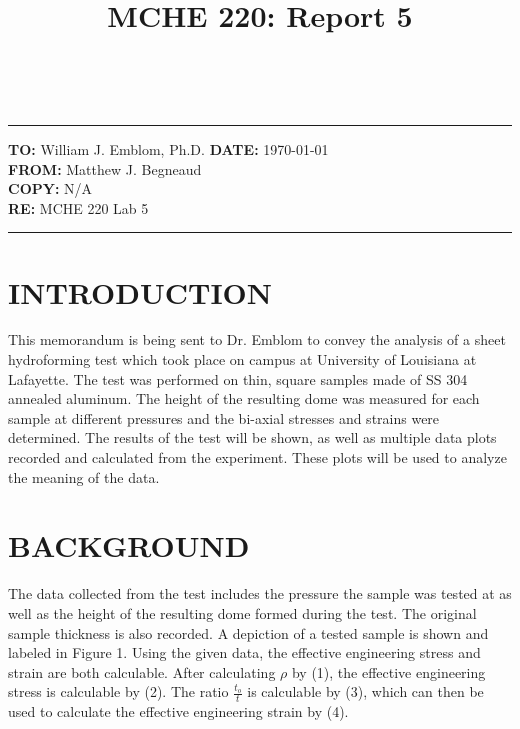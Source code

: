 \documentclass[12pt]{article}
\title{MCHE 220: Report 5}
\begin{document}
\fancyhf{}  
  \renewcommand{\headrulewidth}{0pt}
    \pagestyle{plain}
    
\captionsetup[table]{labelsep=space}

\begin{flushleft}
\hrulefill\\\hrule height 1pt
\vspace{5pt}
\textbf{TO: }William J. Emblom, Ph.D.  \hfill   \textbf{DATE: }\today                
\bigskip\\
\textbf{FROM: }Matthew J. Begneaud
\bigskip\\
\textbf{COPY: }N/A
\bigskip\\
\textbf{RE: }MCHE 220 Lab 5
\vspace{-10pt}
\end{flushleft}
\hrulefill \hrule height 1pt


\section*{\fontsize{12}{12}\selectfont INTRODUCTION}
This memorandum is being sent to Dr. Emblom to convey the analysis of a sheet hydroforming test which took place on campus at University of Louisiana at Lafayette. The test was performed on thin, square samples made of SS 304 annealed aluminum. The height of the resulting dome was measured for each sample at different pressures and the bi-axial stresses and strains were determined. The results of the test will be shown, as well as multiple data plots recorded and calculated from the experiment. These plots will be used to analyze the meaning of the data.
\bigskip



\section*{\fontsize{12}{12}\selectfont BACKGROUND}
The data collected from the test includes the pressure the sample was tested at as well as the height of the resulting dome formed during the test. The original sample thickness is also recorded. A depiction of a tested sample is shown and labeled in Figure 1. Using the given data, the effective engineering stress and strain are both calculable. After calculating $\rho$ by (1), the effective engineering stress is calculable by (2). The ratio $\frac{t_{o}}{t}$ is calculable by (3), which can then be used to calculate the effective engineering strain by (4).
\bigskip
\end{document}
